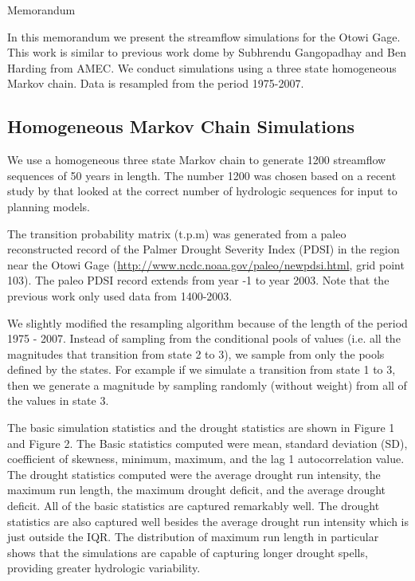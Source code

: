 \documentclass[11pt]{amsart}
\begin{document}
\thispagestyle{empty}

\begin{memoheader}{Memorandum}
\end{memoheader}


In this memorandum we present the streamflow simulations for the Otowi Gage.  This work is similar to previous work dome by Subhrendu Gangopadhay and Ben Harding from AMEC.  We conduct simulations using a three state homogeneous Markov chain. Data is resampled from the period 1975-2007.


\subsection*{Homogeneous Markov Chain Simulations}
We use a homogeneous three state Markov chain to generate 1200 streamflow sequences of 50 years in length.  The number 1200 was chosen based on a recent study by \citep{Guimaraes:2011tc} that looked at the correct number of hydrologic sequences for input to planning models. 

The transition probability matrix (t.p.m) was generated from a paleo reconstructed record of the Palmer Drought Severity Index (PDSI) in the region near the Otowi Gage (\url{http://www.ncdc.noaa.gov/paleo/newpdsi.html}, grid point 103). The paleo PDSI record extends from year -1 to year 2003. Note that the previous work only used data from 1400-2003.  

We slightly modified the resampling algorithm because of the length of the period 1975 - 2007. Instead of sampling from the conditional pools of values (i.e. all the magnitudes that transition from state 2 to 3), we sample from only the pools defined by the states. For example if we simulate a transition from state 1 to 3, then we generate a magnitude by sampling randomly (without weight) from all of the values in state 3.

The basic simulation statistics and the drought statistics are shown in Figure 1 and Figure 2. The Basic statistics computed were mean, standard deviation (SD), coefficient of skewness, minimum, maximum, and the lag 1 autocorrelation value.  The drought statistics computed were the average drought run intensity, the maximum run length, the maximum drought deficit, and the average drought deficit.  All of the basic statistics are captured remarkably well. The drought statistics are also captured well besides the average drought run intensity which is just outside the IQR.  The distribution of maximum run length in particular shows that the simulations are capable of capturing longer drought spells, providing greater hydrologic variability. 
\end{document}
